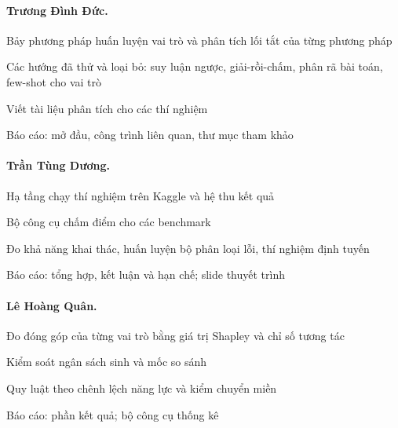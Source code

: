 \documentclass[11pt,a4paper]{article}
\begin{document}
\paragraph{Trương Đình Đức.}
\begin{ddgop}
\item Bảy phương pháp huấn luyện vai trò và phân tích lối tắt của từng phương pháp
\item Các hướng đã thử và loại bỏ: suy luận ngược, giải-rồi-chấm, phân rã bài toán, few-shot cho vai trò
\item Viết tài liệu phân tích cho các thí nghiệm
\item Báo cáo: mở đầu, công trình liên quan, thư mục tham khảo
\end{ddgop}

\paragraph{Trần Tùng Dương.}
\begin{ddgop}
\item Hạ tầng chạy thí nghiệm trên Kaggle và hệ thu kết quả
\item Bộ công cụ chấm điểm cho các benchmark
\item Đo khả năng khai thác, huấn luyện bộ phân loại lỗi, thí nghiệm định tuyến
\item Báo cáo: tổng hợp, kết luận và hạn chế; slide thuyết trình
\end{ddgop}

\paragraph{Lê Hoàng Quân.}
\begin{ddgop}
\item Đo đóng góp của từng vai trò bằng giá trị Shapley và chỉ số tương tác
\item Kiểm soát ngân sách sinh và mốc so sánh
\item Quy luật theo chênh lệch năng lực và kiểm chuyển miền
\item Báo cáo: phần kết quả; bộ công cụ thống kê
\end{ddgop}
\end{document}
